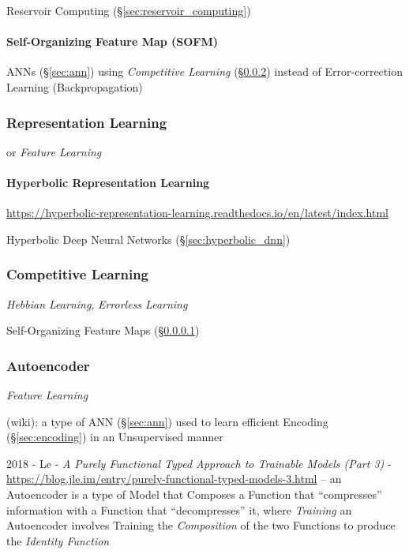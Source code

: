 \fist Reservoir Computing (\S\ref{sec:reservoir_computing})



\paragraph{Self-Organizing Feature Map (SOFM)}\label{sec:sofm}\hfill

ANNs (\S\ref{sec:ann}) using \emph{Competitive Learning}
(\S\ref{sec:competitive_learning}) instead of Error-correction Learning
(Backpropagation)



\subsubsection{Representation Learning}\label{sec:representation_learning}

or \emph{Feature Learning}



\paragraph{Hyperbolic Representation Learning}
\label{sec:hyperbolic_representation_learning}\hfill

\url{https://hyperbolic-representation-learning.readthedocs.io/en/latest/index.html}

Hyperbolic Deep Neural Networks (\S\ref{sec:hyperbolic_dnn})



\subsubsection{Competitive Learning}\label{sec:competitive_learning}

\emph{Hebbian Learning}, \emph{Errorless Learning}

Self-Organizing Feature Maps (\S\ref{sec:sofm})



\subsubsection{Autoencoder}\label{sec:autoencoder}

\emph{Feature Learning}

(wiki): a type of ANN (\S\ref{sec:ann}) used to learn efficient Encoding
(\S\ref{sec:encoding}) in an Unsupervised manner

2018 - Le -
\emph{A Purely Functional Typed Approach to Trainable Models (Part 3)} -
\url{https://blog.jle.im/entry/purely-functional-typed-models-3.html}
--
an Autoencoder is a type of Model that Composes a Function that ``compresses''
information with a Function that ``decompresses'' it, where \emph{Training} an
Autoencoder involves Training the \emph{Composition} of the two Functions to
produce the \emph{Identity Function}

